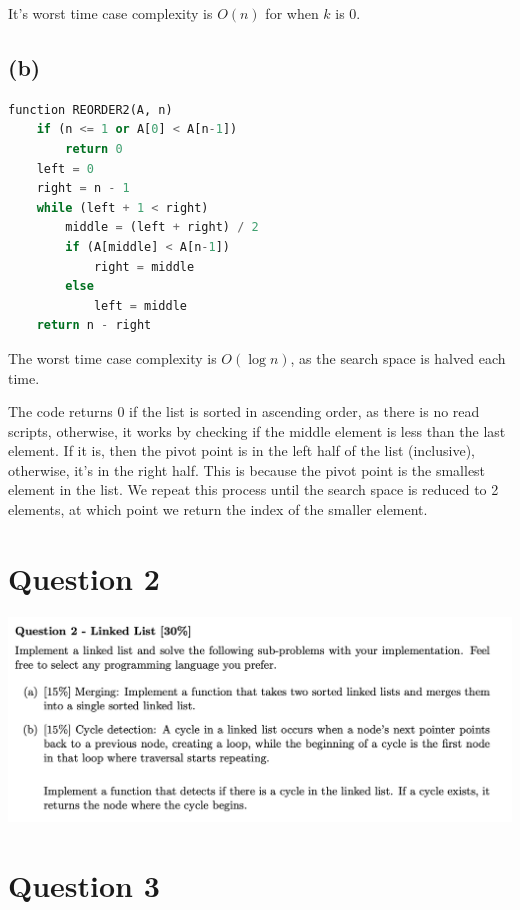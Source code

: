 \documentclass{article}
\begin{document}
It's worst time case complexity is $O(n)$ for when $k$ is 0.

\subsection*{(b)}

\begin{lstlisting}[language=Python]
function REORDER2(A, n)
    if (n <= 1 or A[0] < A[n-1])
        return 0
    left = 0
    right = n - 1
    while (left + 1 < right)
        middle = (left + right) / 2
        if (A[middle] < A[n-1])
            right = middle
        else
            left = middle
    return n - right
\end{lstlisting}

The worst time case complexity is $O(\log n)$, as the search space is halved each time.

The code returns 0 if the list is sorted in ascending order, as there is no read scripts, otherwise, it works by checking if the middle element is less than the last element. If it is, then the pivot point is in the left half of the list (inclusive), otherwise, it's in the right half. This is because the pivot point is the smallest element in the list. We repeat this process until the search space is reduced to 2 elements, at which point we return the index of the smaller element.

\section*{Question 2}

\includegraphics[width=\linewidth]{img/2.png}



\section*{Question 3}
\end{document}
